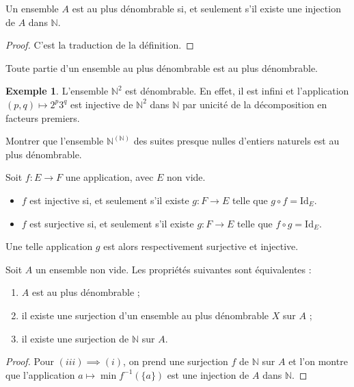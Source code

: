 \documentclass[french]{article}
\newcommand{\N}{\mathbb{N}}
\newcommand{\inv}{^{-1}}
\theoremstyle{plain}
\theoremstyle{definition}
\newtheorem*{ex}{Exemple}
\theoremstyle{remark}
\begin{document}
\begin{prop}%
	Un ensemble $A$ est au plus dénombrable si, et seulement s'il existe une injection de $A$ dans $\N$.
\end{prop}
\begin{proof}
	C'est la traduction de la définition.
\end{proof}

\begin{cor}%
	Toute partie d'un ensemble au plus dénombrable est au plus dénombrable.
\end{cor}

\begin{ex}
	L'ensemble $\N^2$ est dénombrable. En effet, il est infini et l'application $(p,q)\mapsto 2^p3^q$ est injective de $\N^2$ dans $\N$ par unicité de la décomposition en facteurs premiers.
\end{ex}

\begin{exo}
	Montrer que l'ensemble $\N^{(\N)}$ des suites presque nulles d'entiers naturels est au plus dénombrable.
\end{exo}

\begin{lem}%
	Soit $f:E\to F$ une application, avec $E$ non vide.
	\begin{itemize}
		\item $f$ est injective si, et seulement s'il existe $g:F\to E$ telle que $g\circ f=\text{Id}_E$.
		\item $f$ est surjective si, et seulement s'il existe $g:F\to E$ telle que $f\circ g=\text{Id}_E$.
	\end{itemize}
	Une telle application $g$ est alors respectivement surjective et injective.
\end{lem}

\begin{prop}%
	Soit $A$ un ensemble non vide. Les propriétés suivantes sont équivalentes :
	\begin{enumerate}[label=(\roman*)]
		\item $A$ est au plus dénombrable ;
		\item il existe une surjection d'un ensemble au plus dénombrable $X$ sur $A$ ;
		\item il existe une surjection de $\N$ sur $A$.
	\end{enumerate}
\end{prop}
\begin{proof}
	Pour $(iii)\implies(i)$, on prend une surjection $f$ de $\N$ sur $A$ et l'on montre que l'application $a\mapsto\min f\inv(\{a\})$ est une injection de $A$ dans $\N$.
\end{proof}
\end{document}
